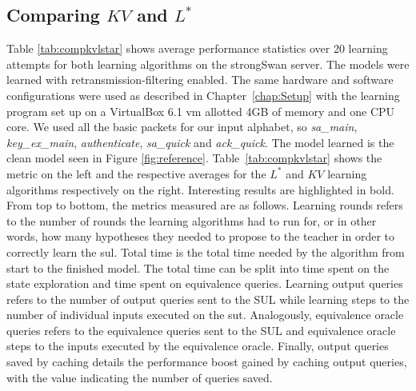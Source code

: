 \subsection{Comparing $KV$ and $L^*$} \label{subsec:comp_kv_lstar}
Table \ref{tab:compkvlstar} shows average performance statistics over 20 learning attempts for both learning algorithms on the strongSwan server. The models were learned with retransmission-filtering enabled. The same hardware and software configurations were used as described in Chapter~\ref{chap:Setup} with the learning program set up on a VirtualBox 6.1 \ac{vm} allotted 4GB of memory and one CPU core. We used all the basic packets for our input alphabet, so
\emph{sa\_main}, \emph{key\_ex\_main}, \emph{authenticate}, \emph{sa\_quick} and \emph{ack\_quick}. The model learned is the clean model seen in Figure \ref{fig:reference}. Table~\ref{tab:compkvlstar} shows the metric on the left and the respective averages for the $L^*$ and $KV$ learning algorithms respectively on the right. Interesting results are highlighted in bold. From top to bottom, the metrics measured are as follows. Learning rounds refers to the number of rounds the learning algorithms had to run for, or in other words, how many hypotheses they needed to propose to the teacher in order to correctly learn the \ac{sul}. Total time is the total time needed by the algorithm from start to the finished model. The total time can be split into time spent on the state exploration and time spent on equivalence queries. Learning output queries refers to the number of output queries sent to the SUL while learning steps to the number of individual inputs executed on the \ac{sut}. Analogously, equivalence oracle queries refers to the equivalence queries sent to the SUL and equivalence oracle steps to the inputs executed by the equivalence oracle. Finally, output queries saved by caching details the performance boost gained by caching output queries, with the value indicating the number of queries saved.

